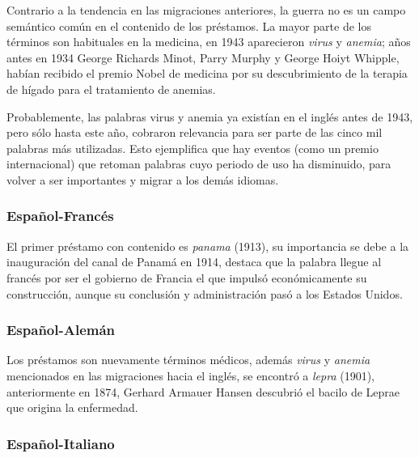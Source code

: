 Contrario a la tendencia en las migraciones anteriores, la guerra no es un campo semántico común en el contenido de los préstamos. La mayor parte de los términos son habituales en la medicina,  en 1943  aparecieron  \textit{virus} y \textit{anemia};  años antes en 1934 George Richards Minot, Parry Murphy y George Hoiyt Whipple, habían recibido el premio Nobel de medicina por su descubrimiento de la terapia de hígado para el tratamiento de anemias.   

Probablemente, las palabras virus y anemia ya existían en el inglés antes de 1943,  pero sólo hasta este año,  cobraron relevancia para ser parte de las cinco mil palabras más utilizadas. Esto ejemplifica que hay eventos (como un premio internacional) que retoman palabras cuyo periodo de uso  ha disminuido,  para volver a ser importantes y migrar a los demás idiomas.


\subsubsection*{Español-Francés}%

El primer préstamo con contenido es \textit{panama} (1913), su importancia se debe a la inauguración del canal de Panamá en 1914, destaca que la palabra llegue al francés por ser el gobierno de Francia el que impulsó económicamente su construcción, aunque su conclusión y administración pasó a los Estados Unidos.  




\subsubsection*{Español-Alemán}


Los préstamos son nuevamente términos médicos, además \textit{virus} y \textit{anemia} mencionados en las migraciones hacia el inglés, se encontró a \textit{lepra} (1901), anteriormente en 1874, Gerhard Armauer Hansen descubrió el bacilo de Leprae que origina la enfermedad.



\subsubsection*{Español-Italiano}%



